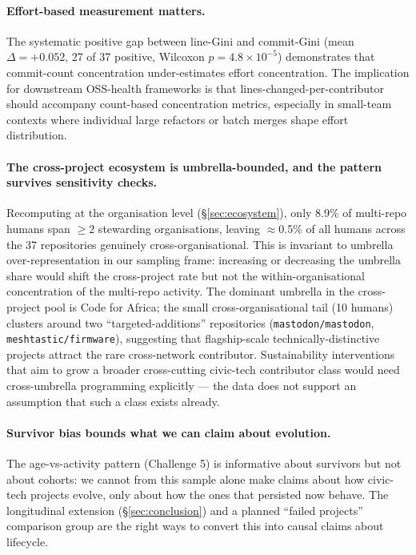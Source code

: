\documentclass[a4paper,UKenglish,cleveref,autoref,thm-restate]{lipics-v2021}
\begin{document}
\paragraph{Effort-based measurement matters.}
The systematic positive gap between line-Gini and commit-Gini (mean $\Delta = +0.052$, 27 of 37 positive, Wilcoxon $p = 4.8 \times 10^{-5}$) demonstrates that commit-count concentration under-estimates effort concentration. The implication for downstream OSS-health frameworks is that lines-changed-per-contributor should accompany count-based concentration metrics, especially in small-team contexts where individual large refactors or batch merges shape effort distribution.

\paragraph{The cross-project ecosystem is umbrella-bounded, and the pattern survives sensitivity checks.}
Recomputing at the organisation level (\S\ref{sec:ecosystem}), only 8.9\% of multi-repo humans span $\geq 2$ stewarding organisations, leaving $\approx$0.5\% of all humans across the 37 repositories genuinely cross-organisational. This is invariant to umbrella over-representation in our sampling frame: increasing or decreasing the umbrella share would shift the cross-project rate but not the within-organisational concentration of the multi-repo activity. The dominant umbrella in the cross-project pool is Code for Africa; the small cross-organisational tail (10 humans) clusters around two ``targeted-additions'' repositories (\texttt{mastodon/mastodon}, \texttt{meshtastic/firmware}), suggesting that flagship-scale technically-distinctive projects attract the rare cross-network contributor. Sustainability interventions that aim to grow a broader cross-cutting civic-tech contributor class would need cross-umbrella programming explicitly --- the data does not support an assumption that such a class exists already.

\paragraph{Survivor bias bounds what we can claim about evolution.}
The age-vs-activity pattern (Challenge 5) is informative about survivors but not about cohorts: we cannot from this sample alone make claims about how civic-tech projects evolve, only about how the ones that persisted now behave. The longitudinal extension (\S\ref{sec:conclusion}) and a planned ``failed projects'' comparison group are the right ways to convert this into causal claims about lifecycle.
\end{document}
